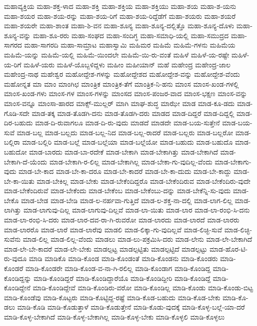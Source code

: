 {ಮಹಾವ್ಯಕ್ತಿಯ
ಮಹಾ-ಶಕ್ತ-ಳಾದ
ಮಹಾ-ಶಕ್ತಿ
ಮಹಾ-ಶಕ್ತಿಯ
ಮಹಾ-ಶಕ್ತಿಯು
ಮಹಾ-ಶಯ
ಮಹಾ-ಶ-ಯನು
ಮಹಾ-ಶಯರ
ಮಹಾ-ಶಯ-ರನ್ನು
ಮಹಾ-ಶಯ-ರಿಗೆ
ಮಹಾ-ಶಯ-ರಿದ್ದೆಡೆಗೆ
ಮಹಾ-ಶಯರು
ಮಹಾ-ಶಯರೆ
ಮಹಾ-ಶಯರೇ
ಮಹಾ-ಶಾಂತ
ಮಹಾ-ಶಿ-ವನ
ಮಹಾ-ಶೂನ್ಯ
ಮಹಾ-ಶೂನ್ಯ-ದಲ್ಲಿತ್ತೊ
ಮಹಾ-ಶೂನ್ಯ-ದೊಳು
ಮಹಾ-ಶೂನ್ಯ-ವನ್ನು
ಮಹಾ-ಶೂ-ರರು
ಮಹಾ-ಸಂಘದ
ಮಹಾ-ಸಂದಿಗ್ಧ
ಮಹಾ-ಸಮಾಧಿ-ಯಲ್ಲಿ
ಮಹಾ-ಸಮುದ್ರದ
ಮಹಾ-ಸಾಗರದ
ಮಹಾ-ಸಾಗರದಿ
ಮಹಾ-ಸಾಮ್ರಾಟ
ಮಹಾಸ್ವಾಮಿ
ಮಹಿಮರ
ಮಹಿಮೆ
ಮಹಿಮೆ-ಗಳನು
ಮಹಿಮೆಯ
ಮಹಿಮೆ-ಯನ್ನು
ಮಹಿಮೆ-ಯಲ್ಲಿ
ಮಹಿಮೆ-ಯಿಂದಲೇ
ಮಹಿಮೆ-ಯಿ-ರು-ವಂತೆ
ಮಹಿಳೆ
ಮಹಿಳೆ-ಯ-ರಷ್ಟೇ
ಮಹಿಳೆ-ಯ-ರಿಗೆ
ಮಹಿಳೆ-ಯರು
ಮಹಿಳೆ-ಯೊಬ್ಬಳಿದ್ದಳು
ಮಹೀಂ
ಮಹೀಯಾನ್
ಮಹೆ
ಮಹೇಂದ್ರ
ಮಹೇಂದ್ರ-ಜಾಲ
ಮಹೇಂದ್ರ-ನಾಥ
ಮಹೇಶ್ವರ
ಮಹೋದ್ದೇಶ-ಗಳನ್ನು
ಮಹೋದ್ದೇಶದ
ಮಹೋದ್ದೇಶ-ವನ್ನು
ಮಹೋದ್ದೇಶ-ವೆಂದು
ಮಹೋನ್ನತ
ಮಾ
ಮಾಂ
ಮಾಂಗಿಛ
ಮಾಂತ್ರಿಕ
ಮಾಂತ್ರಿಕ-ತೆಗೆ
ಮಾಂತ್ರಿಕ-ನಿ-ಹನು
ಮಾಂಸ
ಮಾಂಸ-ಖಂಡ-ಗಳಲ್ಲಿ
ಮಾಂಸ-ಖಂಡ-ಗಳು
ಮಾಂಸ-ಗಳ
ಮಾಂಸ-ಗಳನ್ನು
ಮಾಂಸದ
ಮಾಂಸ-ಪಂಜರ-ವಾದ
ಮಾಂಸ-ಭಕ್ಷಣ
ಮಾಂಸ-ವನ್ನು
ಮಾಂಸ-ವನ್ನೂ
ಮಾಂಸಾ-ಹಾರದ
ಮಾಕ್ಸ್-ಮುಲ್ಲರ್
ಮಾಗಿ
ಮಾಘ-ಶುದ್ಧ
ಮಾಝೇ
ಮಾಡ
ಮಾಡ-ಕೂ-ಡದು
ಮಾಡ-ಗೊಡಿ-ಸದೇ
ಮಾಡ-ತಕ್ಕ
ಮಾಡ-ತೊಡಗಿ-ದನು
ಮಾಡ-ತೊಡಗಿ-ದರು
ಮಾಡದ
ಮಾಡ-ದಿದ್ದರೆ
ಮಾಡ-ದಿದ್ದಲ್ಲಿ
ಮಾಡ-ದಿರ-ಬಹುದು
ಮಾಡ-ದಿ-ರುವಾಗಲೂ
ಮಾಡ-ದಿ-ರು-ವುದು
ಮಾಡದೆ
ಮಾಡದೇ
ಮಾಡ-ಬಯ-ಸುತ್ತೇನೆ
ಮಾಡ-ಬಯ-ಸುವೆ
ಮಾಡ-ಬಲ್ಲ
ಮಾಡ-ಬಲ್ಲದು
ಮಾಡ-ಬಲ್ಲ-ನಿದ
ಮಾಡ-ಬಲ್ಲ-ರಾದರೆ
ಮಾಡ-ಬಲ್ಲರು
ಮಾಡ-ಬಲ್ಲರೋ
ಮಾಡ-ಬಲ್ಲಿರಾ
ಮಾಡ-ಬಲ್ಲಿರಿ
ಮಾಡ-ಬಲ್ಲೆ
ಮಾಡ-ಬಲ್ಲೆಯಾ
ಮಾಡ-ಬಲ್ಲೆಯೋ
ಮಾಡ-ಬಹುದು
ಮಾಡ-ಬಹುದೊ
ಮಾಡ-ಬಹುದೋ
ಮಾಡ-ಬಾರದು
ಮಾಡ-ಬಾ-ರದೇಕೆ
ಮಾಡ-ಬೇಕಾಗಿ
ಮಾಡ-ಬೇಕಾಗಿತ್ತು
ಮಾಡ-ಬೇಕಾಗಿದೆ
ಮಾಡ-ಬೇಕಾಗಿ-ದೆ-ಯೆಂದು
ಮಾಡ-ಬೇಕಾಗಿ-ರ-ಲಿಲ್ಲ
ಮಾಡ-ಬೇಕಾಗಿಲ್ಲ
ಮಾಡ-ಬೇಕಾ-ಗು-ವುದಿಲ್ಲ-ವೆಂದು
ಮಾಡ-ಬೇಕಾಗು-ವುದು
ಮಾಡ-ಬೇ-ಕಾದ
ಮಾಡ-ಬೇ-ಕಾ-ದರೂ
ಮಾಡ-ಬೇ-ಕಾದರೆ
ಮಾಡ-ಬೇ-ಕಾ-ದುದು
ಮಾಡ-ಬೇ-ಕಾದ್ದು
ಮಾಡ-ಬೇ-ಕಾ-ಯಿತು
ಮಾಡ-ಬೇಕಿಲ್ಲ
ಮಾಡ-ಬೇಕು
ಮಾಡ-ಬೇಕೆಂದಿದ್ದರೊ
ಮಾಡ-ಬೇಕೆಂದಿರುವ
ಮಾಡ-ಬೇಕೆಂದಿರು-ವುದೇ
ಮಾಡ-ಬೇಕೆಂದಿರುವೆ
ಮಾಡ-ಬೇಕೆಂದು
ಮಾಡ-ಬೇಕೆಂಬ
ಮಾಡ-ಬೇಕೆಂಬು-ದನ್ನು
ಮಾಡ-ಬೇಕೆನ್ನಿ-ಸು-ವುದು
ಮಾಡ-ಬೇಕೊ
ಮಾಡ-ಬೇಡ
ಮಾಡ-ಬೇಡಿ
ಮಾಡ-ಲ-ನರ್ಹವಾ-ಗುತ್ತಿದೆ
ಮಾಡ-ಲ-ಶಕ್ತ-ನಾ-ದಲ್ಲಿ
ಮಾಡ-ಲಾಗ-ಲಿಲ್ಲ
ಮಾಡ-ಲಾಗಿತ್ತು
ಮಾಡ-ಲಾಗುವು-ದಿಲ್ಲ
ಮಾಡ-ಲಾಗುವು-ದಿಲ್ಲವೆ
ಮಾಡ-ಲಾ-ಯಿತು
ಮಾಡ-ಲಾರ
ಮಾಡ-ಲಾ-ರಂಭಿ-ಸಿ-ದನು
ಮಾಡ-ಲಾ-ರಂಭಿ-ಸಿ-ದರು
ಮಾಡ-ಲಾರ-ದವ-ರಾ-ಗಿ-ರುವರೋ
ಮಾಡ-ಲಾರದು
ಮಾಡ-ಲಾರದೆ
ಮಾಡ-ಲಾರರು
ಮಾಡ-ಲಾರರೊ
ಮಾಡ-ಲಾರೆ
ಮಾಡ-ಲಾರೆವು
ಮಾಡಲಿ
ಮಾಡ-ಲಿಕ್ಕಾ-ಗು-ವುದಿಲ್ಲವೆ
ಮಾಡ-ಲಿಚ್ಛಿ-ಸುವೆ
ಮಾಡ-ಲಿಚ್ಛಿ-ಸುವೆನು
ಮಾಡ-ಲಿಲ್ಲ
ಮಾಡ-ಲಿಲ್ಲ-ವೆಂದು
ಮಾಡಲು
ಮಾಡ-ಲು-ಪಕ್ರಮಿಸಿ-ದರು
ಮಾಡ-ಲೇನು
ಮಾಡ-ಲೇ-ಬೇಕಾಗಿದೆ
ಮಾಡ-ಲೇ-ಬೇ-ಕಾದರೆ
ಮಾಡ-ಲೇ-ಬೇಕು
ಮಾಡಲ್ಪಟ್ಟ
ಮಾಡಲ್ಪಟ್ಟಿತು
ಮಾಡಲ್ಪಟ್ಟಿದೆ
ಮಾಡಲ್ಪಟ್ಟು
ಮಾಡ-ಹೊರ-ಟಿ-ರು-ವುದೂ
ಮಾಡಿ
ಮಾಡಿಕೊ
ಮಾಡಿ-ಕೊಂಡ
ಮಾಡಿ-ಕೊಂಡಂತೆ
ಮಾಡಿ-ಕೊಂಡನು
ಮಾಡಿ-ಕೊಂಡರು
ಮಾಡಿ-ಕೊಂಡರೆ
ಮಾಡಿ-ಕೊಂಡರೇ
ಮಾಡಿ-ಕೊಂಡ-ವ-ನಾ-ಗಿ-ರಲಿಲ್ಲ
ಮಾಡಿ-ಕೊಂಡಾಗ
ಮಾಡಿ-ಕೊಂಡಿದ್ದ
ಮಾಡಿ-ಕೊಂಡಿದ್ದನ್ನು
ಮಾಡಿ-ಕೊಂಡಿದ್ದರೆ
ಮಾಡಿ-ಕೊಂಡಿದ್ದಾರೆಯೊ
ಮಾಡಿ-ಕೊಂಡಿದ್ದೀರಿ
ಮಾಡಿ-ಕೊಂಡಿದ್ದೆ
ಮಾಡಿ-ಕೊಂಡಿದ್ದೇನೆ
ಮಾಡಿ-ಕೊಂಡಿದ್ದೇವೆ
ಮಾಡಿ-ಕೊಂಡಿರು-ವರೋ
ಮಾಡಿ-ಕೊಂಡಿಲ್ಲ
ಮಾಡಿ-ಕೊಂಡು
ಮಾಡಿ-ಕೊಂಡು-ಬಿಟ್ಟ
ಮಾಡಿ-ಕೊಂಡೆವು
ಮಾಡಿ-ಕೊಟ್ಟರು
ಮಾಡಿ-ಕೊಟ್ಟಿದ್ದ-ರಷ್ಟೆ
ಮಾಡಿ-ಕೊಡ-ಬಹುದು
ಮಾಡಿ-ಕೊಡ-ಬೇಕು
ಮಾಡಿ-ಕೊ-ಡಲು
ಮಾಡಿ-ಕೊಡಿ
ಮಾಡಿ-ಕೊಡುತ್ತಾಳೆ
ಮಾಡಿ-ಕೊಡುತ್ತೇನೆ
ಮಾಡಿ-ಕೊಡು-ವುದಕ್ಕೆ
ಮಾಡಿ-ಕೊಳ್ಳ-ಬಲ್ಲೆ-ಯಾ-ದರೆ
ಮಾಡಿ-ಕೊಳ್ಳ-ಬೇಕಾಗಿದೆ
ಮಾಡಿ-ಕೊಳ್ಳ-ಬೇಕಾಗಿಲ್ಲ
ಮಾಡಿ-ಕೊಳ್ಳ-ಬೇಕು
ಮಾಡಿ-ಕೊಳ್ಳಲಿ
ಮಾಡಿ-ಕೊಳ್ಳಲು
}
